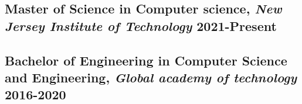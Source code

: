 \documentclass[letter,10pt]{article}
\begin{document}
\subsection{{ Master of Science in Computer science}, \textit{New Jersey Institute of Technology}	\hfill 2021-Present}

\begin{itemize}
    
\end{itemize}

\subsection{{Bachelor of Engineering in Computer Science and Engineering}, \textit{Global academy of technology}	\hfill 2016-2020}
\end{document}
